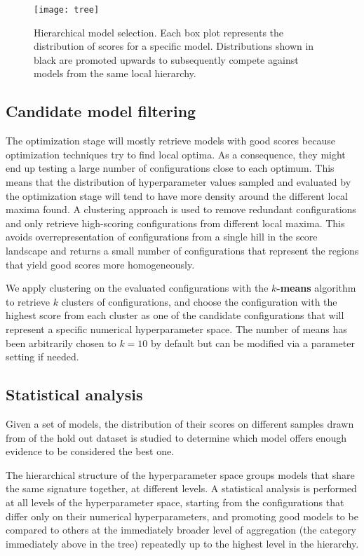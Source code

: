 \begin{figure}[here]
	\texttt{[image: tree]}
	\caption[Hierarchical model selection]{Hierarchical model selection. Each box plot represents
	the distribution of scores for a specific model. Distributions shown in black are promoted
	upwards to subsequently compete against models from the same local hierarchy.}
	\label{img:tree}
\end{figure}

\subsection{Candidate model filtering}
The optimization stage will mostly retrieve models with good scores because optimization
techniques try to find local optima. As a consequence, they might end up testing a large number
of configurations close to each optimum. This means that the distribution of hyperparameter values
sampled and evaluated by the optimization stage will tend to have more density around the different
local maxima found. A clustering approach is used to remove redundant configurations and only retrieve
high-scoring configurations from different local maxima. This avoids overrepresentation of
configurations from a single hill in the score landscape and returns a small number of
configurations that represent the regions that yield good scores more homogeneously.

We apply clustering on the evaluated configurations with the {\bf $k$-means} algorithm to retrieve
$k$ clusters of configurations, and choose the configuration with the highest score from each cluster as
one of the candidate configurations that will represent a specific numerical hyperparameter space.
The number of means has been arbitrarily chosen to $k = 10$ by default but can be modified via a
parameter setting if needed.

\subsection{Statistical analysis}

Given a set of models, the distribution of their scores on different samples drawn from of the hold out
dataset is studied to determine which model offers enough evidence to be considered the best one.

The hierarchical structure of the hyperparameter space groups models that share the same signature
together, at different levels. A statistical analysis is performed at all levels of the
hyperparameter space, starting from the configurations that differ only on their numerical
hyperparameters, and promoting good models to be compared to others at the immediately broader
level of aggregation (the category immediately above in the tree) repeatedly up to the highest level
in the hierarchy.

